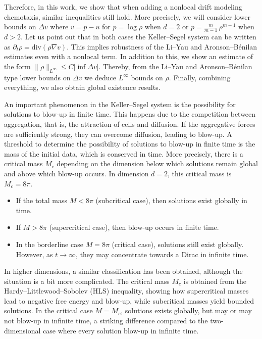 \documentclass[11pt,a4paper]{article}
\numberwithin{equation}{section}
\newcommand{\dive}{\mbox{div}}
\theoremstyle{plain}
\theoremstyle{remark}
\begin{document}
Therefore, in this work, we show that when adding a nonlocal drift modeling chemotaxis, similar inequalities still hold. More precisely, we will consider lower bounds on $\Delta v$ where $v=p-u$ for $p=\log\rho$ when $d=2$ or $p=\frac{m}{m-1}\,\rho^{m-1}$ when $d>2$. Let us point out that in both cases the Keller--Segel system can be written as $\partial_t\rho=\dive(\rho\nabla v )$. This implies robustness of the Li--Yau and Aronson--B\'enilan estimates even with a nonlocal term. In addition to this, we show an estimate of the form $\|\rho\|_{L^\infty}\leq C|\inf\Delta v|$. Thereby, from the Li--Yau and Aronson--B\'enilan type lower bounds on $\Delta v$ we deduce $L^\infty$ bounds on $\rho$. Finally, combining everything, we also obtain global existence results.%






\iffalse
An important phenomenon in the Keller--Segel system is the possibility for solutions to blow-up in finite time. This happens due to the competition between aggregation, that is, the attraction of cells and diffusion. If the aggregative forces are sufficiently strong, they can overcome diffusion, leading to blow-up. A threshold to determine the possibility of solutions to blow-up in finite time is the mass of the initial data, which is conserved in time. More precisely, there is a critical mass $M_c$ depending on the dimension below which solutions remain global and above which blow-up occurs. In dimension $d=2$, this critical mass is $M_c=8\pi$.  
\begin{itemize}
\item If the total mass $M < 8\pi$ (subcritical case), then solutions exist globally in time.
\item If $M > 8\pi$ (supercritical case), then blow-up occurs in finite time.
\item In the borderline case $M=8\pi$ (critical case), solutions still exist globally. However, as $t \to \infty$, they may concentrate towards a  Dirac in infinite time. 
\end{itemize}

\medskip

In higher dimensions, a similar classification has been obtained, although the situation is a bit more complicated. The critical mass $M_c$ is obtained from the Hardy--Littlewood--Sobolev (HLS) inequality, showing how supercritical masses lead to negative free energy and blow-up, while subcritical masses yield bounded solutions. In the critical case $M=M_c$, solutions exists globally, but may or may not blow-up in infinite time, a striking difference compared to the two-dimensional case where every solution blow-up in infinite time.
\end{document}
